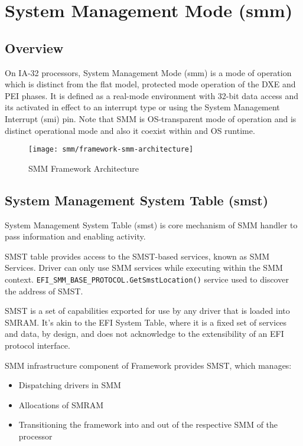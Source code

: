 \section{System Management Mode (\gls{smm})}\label{section-smm}
\subsection{Overview}
On IA-32 processors, System Management Mode (\gls{smm}) is a mode of operation which is distinct from the flat model, protected mode operation of the DXE and PEI phases. It is defined as a real-mode environment with 32-bit data access and its activated in effect to an interrupt type or using the System Management Interrupt (\gls{smi}) pin. Note that SMM is OS-transparent mode of operation and is distinct operational mode and also it coexist within and OS runtime.

\begin{figure}[!htbp]
	\centering
	\texttt{[image: smm/framework-smm-architecture]}
	\caption{SMM Framework Architecture}\label{fig:framework-smm-architecture}
\end{figure}


\subsection{System Management System Table (\gls{smst})}
System Management System Table (\gls{smst}) is core mechanism of SMM handler to pass information and enabling activity.

SMST table provides access to the SMST-based services, known as SMM Services. Driver can only use SMM services while executing within the SMM context. \verb|EFI_SMM_BASE_PROTOCOL.GetSmstLocation()| service used to discover the address of SMST.

SMST is a set of capabilities exported for use by any driver that is loaded into SMRAM. It's akin to the EFI System Table, where it is a fixed set of services and data, by design, and does not acknowledge to the extensibility of an EFI protocol interface.

SMM infrastructure component of Framework provides SMST, which manages:
\begin{itemize}
	\item Dispatching drivers in SMM
	\item Allocations of SMRAM
	\item Transitioning the framework into and out of the respective SMM of the processor
\end{itemize}

